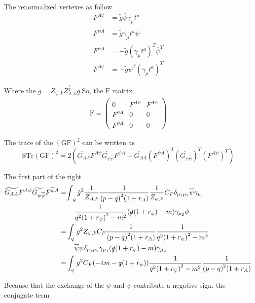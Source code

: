 \documentclass[UTF8]{ctexart}
\begin{document}
\par The renormalized vertexes as follow
\begin{align}
F^{A\psi}&=\tilde{g}\overline{\psi}\gamma_{\mu}t^{a}
\\F^{\overline{\psi}A}&=\tilde{g}\gamma_{\mu}t^{a}\psi
\\F^{\psi A}&=-\tilde{g}{(\gamma_{\mu}t^{a})}^{T}{\overline{\psi}}^T
\\F^{A\overline{\psi}}&=-\tilde{g}{\psi}^{T}{({\gamma_{\mu}t^{a}})}^T
\end{align}
\par Where the $\tilde{g}=Z_{\psi,k}Z_{A,k}^{\frac{1}{2}}g$.So, the $\mathrm{F}$ matrix
\begin{gather}
\mathrm{F}=\begin{pmatrix}0&F^{A\psi}&F^{A\overline{\psi}}\\F^{\psi A}&0&0\\F^{\overline{\psi}A}&0&0\end{pmatrix}
\end{gather}
\par The trace of the $\mathrm{{(GF)}^2}$ can be written as
\begin{equation}
\mathrm{STr}\mathrm{{(GF)}^2}=2(\widetilde{G_{AA}}F^{A\psi}\widetilde{G_{\psi\overline{\psi}}}F^{\overline{\psi}A}-\widetilde{G_{AA}}{(F^{\overline{\psi}A})}^{T}{(\widetilde{G_{\psi\overline{\psi}}})}^{T}{(F^{A\psi})}^{T})
\end{equation}
\par The first part of the right
\begin{align}
\widetilde{G_{AA}}F^{A\psi}\widetilde{G_{\psi\overline{\psi}}}F^{\overline{\psi}A}=&{\int}_{q}\,{\tilde{g}}^{2}\frac{1}{Z_{A,k}}\frac{1}{{(p-q)}^2 (1+r_A)}\frac{1}{Z_{\psi,k}}C_F\delta_{\mu_1 \mu_2}\overline{\psi}\gamma_{\mu_1}
\notag\\&\,\,\,\,\,\,\,\frac{1}{q^{2}{(1+r_\psi)}^{2}-m^2}(\slashed{q}(1+r_\psi)-m)\gamma_{\mu_2}\psi
\notag\\=&\int_{q}\,g^{2}Z_{\psi,k}C_F\frac{1}{{(p-q)}^2 (1+r_A)}\frac{1}{q^{2}{(1+r_\psi)}^{2}-m^2}
\notag\\&\,\,\,\,\,\,\,\overline{\psi}\psi\delta_{\mu_1 \mu_2}\gamma_{\mu_1}(\slashed{q}(1+r_\psi)-m)\gamma_{\mu_2}
\notag\\=&\int_{q}\,g^2 C_F (-4m-\slashed{q}(1+r_{\psi}))\frac{1}{q^2{(1+r_{\psi})}^2-m^2}\frac{1}{{(p-q)}^2 (1+r_A)}
\end{align}
\par Because that the exchange of the $\overline{\psi}$ and $\psi$ contribute a negative sign, the conjugate term
\end{document}
